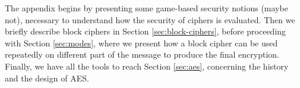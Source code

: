 \documentclass[12pt,a4paper]{book}
\theoremstyle{definition}
\begin{document}
	The appendix begins by presenting some game-based security notions (maybe not), necessary to understand how the security of ciphers is evaluated. Then we briefly describe block ciphers in Section \ref{sec:block-ciphers}, before proceeding with Section \ref{sec:modes}, where we present how a block cipher can be used repeatedly on different part of the message to produce the final encryption. Finally, we have all the tools to reach Section \ref{sec:aes}, concerning the history and the design of AES.

\end{document}
